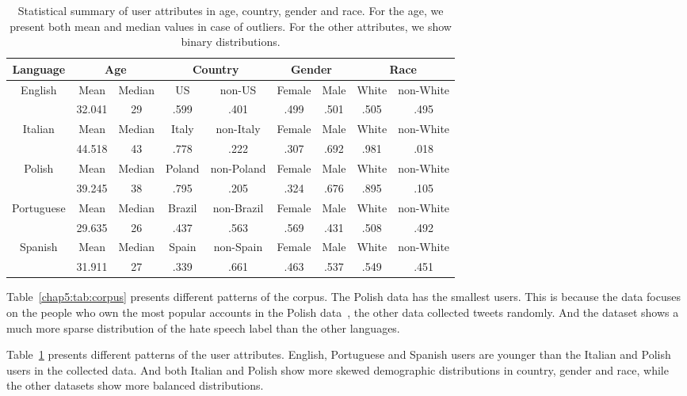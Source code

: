 \begin{table}[tb!]
\centering
\begin{tabular}{c||cc|cc|cc|cc}
Language & \multicolumn{2}{c|}{Age} & \multicolumn{2}{c|}{Country} & \multicolumn{2}{c|}{Gender} & \multicolumn{2}{c}{Race} \\\hline\hline
\multirow{2}{*}{English} & Mean & Median & US & non-US & Female & Male & White & non-White \\
 & 32.041 & 29 & .599 & .401 & .499 & .501 & .505 & .495 \\\hline
\multirow{2}{*}{Italian} & Mean & Median & Italy & non-Italy & Female & Male & White & non-White \\
 & 44.518 & 43 & .778 & .222 & .307 & .692 & .981 & .018 \\\hline
\multirow{2}{*}{Polish} & Mean & Median & Poland & non-Poland & Female & Male & White & non-White \\
 & 39.245 & 38 & .795 & .205 & .324 & .676 & .895 & .105 \\\hline
\multirow{2}{*}{Portuguese} & Mean & Median & Brazil & non-Brazil & Female & Male & White & non-White \\
 & 29.635 & 26 & .437 & .563 & .569 & .431 & .508 & .492 \\\hline
\multirow{2}{*}{Spanish} & Mean & Median & Spain & non-Spain & Female & Male & White & non-White \\
 & 31.911 & 27 & .339 & .661 & .463 & .537 & .549 & .451
\end{tabular}
\caption{Statistical summary of user attributes in age, country, gender and race. For the age, we present both mean and median values in case of outliers. For the other attributes, we show binary distributions.}
\label{chap5:tab:user}
\end{table}

Table~\ref{chap5:tab:corpus} presents different patterns of the corpus. 
The Polish data has the smallest users. 
This is because the data focuses on the people who own the most popular accounts in the Polish data~\cite{ptaszynski2017learning}, the other data collected tweets randomly.
And the dataset shows a much more sparse distribution of the hate speech label than the other languages.

Table~\ref{chap5:tab:user} presents different patterns of the user attributes. 
English, Portuguese and Spanish users are younger than the Italian and Polish users in the collected data.
And both Italian and Polish show more skewed demographic distributions in country, gender and race, while the other datasets show more balanced distributions.


